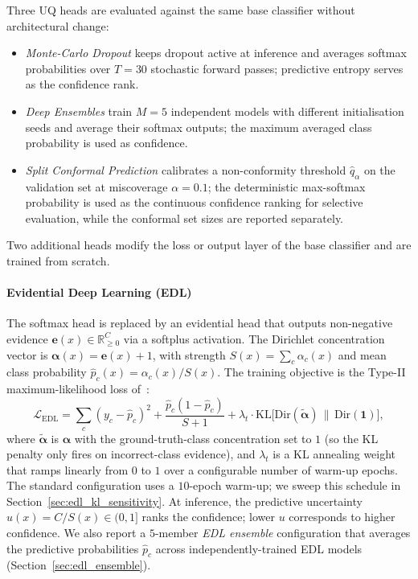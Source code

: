\documentclass[journal]{IEEEtran}
\begin{document}
Three UQ heads are evaluated against the same base classifier without architectural change:
\begin{itemize}
\item \emph{Monte-Carlo Dropout} keeps dropout active at inference and averages softmax probabilities over $T = 30$ stochastic forward passes; predictive entropy serves as the confidence rank.
\item \emph{Deep Ensembles} train $M = 5$ independent models with different initialisation seeds and average their softmax outputs; the maximum averaged class probability is used as confidence.
\item \emph{Split Conformal Prediction} calibrates a non-conformity threshold $\hat{q}_\alpha$ on the validation set at miscoverage $\alpha = 0.1$; the deterministic max-softmax probability is used as the continuous confidence ranking for selective evaluation, while the conformal set sizes are reported separately.
\end{itemize}

Two additional heads modify the loss or output layer of the base classifier and are trained from scratch.

\paragraph{Evidential Deep Learning (EDL)} The softmax head is replaced by an evidential head that outputs non-negative evidence $\boldsymbol{e}(x) \in \mathbb{R}_{\geq 0}^{C}$ via a softplus activation. The Dirichlet concentration vector is $\boldsymbol{\alpha}(x) = \boldsymbol{e}(x) + 1$, with strength $S(x) = \sum_c \alpha_c(x)$ and mean class probability $\hat{p}_c(x) = \alpha_c(x) / S(x)$. The training objective is the Type-II maximum-likelihood loss of~\cite{sensoy2018evidential}:
\begin{equation}
\mathcal{L}_{\text{EDL}} = \sum_c (y_c - \hat{p}_c)^2 + \frac{\hat{p}_c (1 - \hat{p}_c)}{S + 1} + \lambda_t \cdot \mathrm{KL}\big[\mathrm{Dir}(\tilde{\boldsymbol{\alpha}}) \,\|\, \mathrm{Dir}(\mathbf{1})\big],
\end{equation}
where $\tilde{\boldsymbol{\alpha}}$ is $\boldsymbol{\alpha}$ with the ground-truth-class concentration set to $1$ (so the KL penalty only fires on incorrect-class evidence), and $\lambda_t$ is a KL annealing weight that ramps linearly from $0$ to $1$ over a configurable number of warm-up epochs. The standard configuration uses a $10$-epoch warm-up; we sweep this schedule in Section~\ref{sec:edl_kl_sensitivity}. At inference, the predictive uncertainty $u(x) = C / S(x) \in (0, 1]$ ranks the confidence; lower $u$ corresponds to higher confidence. We also report a $5$-member \emph{EDL ensemble} configuration that averages the predictive probabilities $\hat{p}_c$ across independently-trained EDL models (Section~\ref{sec:edl_ensemble}).
\end{document}
